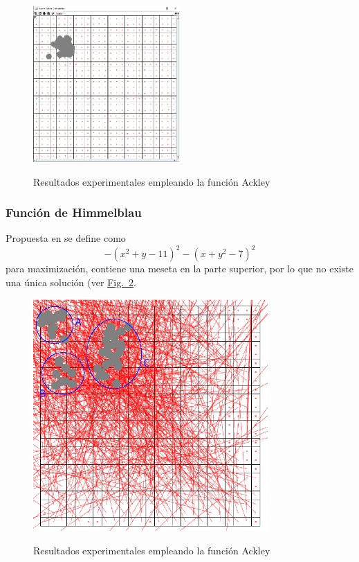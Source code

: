 \documentclass[runningheads]{llncs}
\newcommand{\refcruzada}[2]{\hyperref[#2]{#1~\ref{#2}}}
\begin{document}
    \begin{figure}[htbp]
		\centering
		\includegraphics[width=0.5\textwidth]{Resultado_ackley}
		\label{fig:3}
		\caption{Resultados experimentales empleando la función Ackley}
	\end{figure}

    \subsubsection{Función de Himmelblau} Propuesta en \cite{HimmelblauFunction} se define como
    \[  -(x^2 + y - 11)^2 - (x + y^2 - 7)^2  \] para maximización, contiene una meseta en la parte superior, por lo que no existe una única solución (ver \refcruzada{Fig.}{fig:4}.

    \begin{figure}[htbp]
	\centering
	\includegraphics[width=0.8\textwidth]{Resultado_himmelblau}
	\label{fig:4}
	\caption{Resultados experimentales empleando la función Ackley}
\end{figure}
\end{document}
